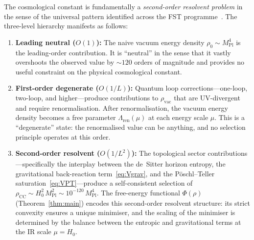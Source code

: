 \documentclass[12pt,a4paper]{article}
\theoremstyle{definition}
\theoremstyle{plain}
\theoremstyle{remark}
\begin{document}
The cosmological constant is fundamentally a \emph{second-order resolvent
problem} in the sense of the universal pattern identified across the FST
programme~\cite{FST-Unified2026,GeigerRH2026c}. The three-level hierarchy
manifests as follows:

\begin{enumerate}
  \item \textbf{Leading neutral ($O(1)$):}\; The naive vacuum energy
        density $\rho_0 \sim M_{\mathrm{Pl}}^4$ is the leading-order
        contribution. It is ``neutral'' in the sense that it vastly
        overshoots the observed value by $\sim 120$ orders of magnitude
        and provides no useful constraint on the physical cosmological
        constant.
  \item \textbf{First-order degenerate ($O(1/L)$):}\; Quantum loop
        corrections---one-loop, two-loop, and higher---produce
        contributions to $\rho_{\mathrm{vac}}$ that are UV-divergent
        and require renormalisation. After renormalisation, the vacuum
        energy density becomes a free parameter $\Lambda_{\mathrm{ren}}(\mu)$
        at each energy scale $\mu$. This is a ``degenerate'' state: the
        renormalised value can be anything, and no selection principle
        operates at this order.
  \item \textbf{Second-order resolvent ($O(1/L^2)$):}\; The topological
        sector contributions---specifically the interplay between the
        de~Sitter horizon entropy, the gravitational back-reaction
        term~\eqref{eq:Vgrav}, and the P\"oschl--Teller
        saturation~\eqref{eq:VPT}---produce a self-consistent selection
        of $\rho_{\mathrm{CC}} \sim H_0^2\,M_{\mathrm{Pl}}^2 \sim
        10^{-120}\,M_{\mathrm{Pl}}^4$. The free-energy functional
        $\Phi(\rho)$ (Theorem~\ref{thm:main}) encodes this second-order
        resolvent structure: its strict convexity ensures a unique
        minimiser, and the scaling of the minimiser is determined by the
        balance between the entropic and gravitational terms at the
        IR scale $\mu = H_0$.
\end{enumerate}
\end{document}

